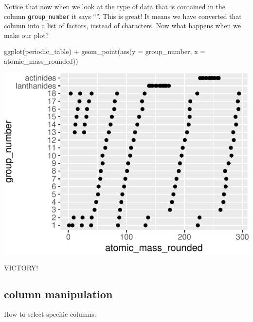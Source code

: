 \documentclass[
]{krantz}
\newenvironment{Shaded}{\begin{snugshade}}{\end{snugshade}}
\newcommand{\AttributeTok}[1]{\textcolor[rgb]{0.77,0.63,0.00}{#1}}
\newcommand{\FunctionTok}[1]{\textcolor[rgb]{0.00,0.00,0.00}{#1}}
\newcommand{\NormalTok}[1]{#1}
\newcommand{\SpecialCharTok}[1]{\textcolor[rgb]{0.00,0.00,0.00}{#1}}
\begin{document}
Notice that now when we look at the type of data that is contained in the column \texttt{group\_number} it says ``''. This is great! It means we have converted that column into a list of factors, instead of characters. Now what happens when we make our plot?

\begin{Shaded}
\begin{Highlighting}[]
\FunctionTok{ggplot}\NormalTok{(periodic\_table) }\SpecialCharTok{+}
  \FunctionTok{geom\_point}\NormalTok{(}\FunctionTok{aes}\NormalTok{(}\AttributeTok{y =}\NormalTok{ group\_number, }\AttributeTok{x =}\NormalTok{ atomic\_mass\_rounded))}
\end{Highlighting}
\end{Shaded}

\begin{center}\includegraphics[width=1\linewidth]{index_files/figure-latex/unnamed-chunk-192-1} \end{center}

VICTORY!

\hypertarget{column-manipulation}{%
\subsection{column manipulation}\label{column-manipulation}}

How to select specific columns:
\end{document}
